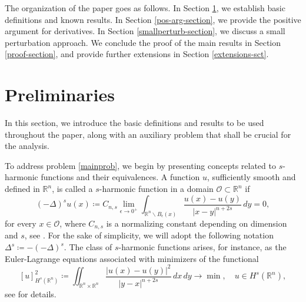 \documentclass[reqno,11pt]{amsart}
\numberwithin{equation}{section}
\numberwithin{equation}{section}
\begin{document}


The organization of the paper goes as follows. In Section \ref{prelim-section}, we establish basic definitions and known results. In Section \ref{pos-arg-section}, we provide the positive argument for derivatives. In Section \ref{smallperturb-section}, we discuss a small perturbation approach. We conclude the proof of the main results in Section \ref{proof-section}, and provide further extensions in Section \ref{extensions-sct}.

\section{Preliminaries}\label{prelim-section}

In this section, we introduce the basic definitions and results to be used throughout the paper, along with an auxiliary problem that shall be crucial for the analysis. 

To address problem \eqref{mainprob}, we begin by presenting concepts related to $s$-harmonic functions and their equivalences. A function \( u \), sufficiently smooth and defined in \(\mathbb{R}^n\), is called a \( s \)-harmonic function in a domain \(\mathcal{O} \subset \mathbb{R}^n\) if
\begin{equation}\label{frac lap as pseudo}
    (-\Delta)^s u(x) \coloneqq C_{n,s} \lim_{\epsilon \to 0^+}\int_{\mathbb{R}^n \backslash B_\epsilon(x)} \frac{u(x) - u(y)}{|x-y|^{n+2s}}\,dy = 0,
\end{equation}
for every \( x \in \mathcal{O} \), where $C_{n,s}$ is a normalizing constant depending on dimension and $s$, see \cite{DPV}. For the sake of simplicity, we will adopt the following notation $\Delta^s \coloneqq -(-\Delta)^s$. The class of \(s\)-harmonic functions arises, for instance, as the Euler-Lagrange equations associated with minimizers of the functional
\[
[u]_{H^s(\mathbb{R}^n)}^2 \coloneqq \iint_{\mathbb{R}^n \times \mathbb{R}^n}\frac{|u(x) - u(y)|^2}{|y-x|^{n+2s}}\,dx\,dy \longrightarrow \min, \quad u \in H^s(\mathbb{R}^n),
\]
see \cite{SILV06} for details. 
\end{document}
